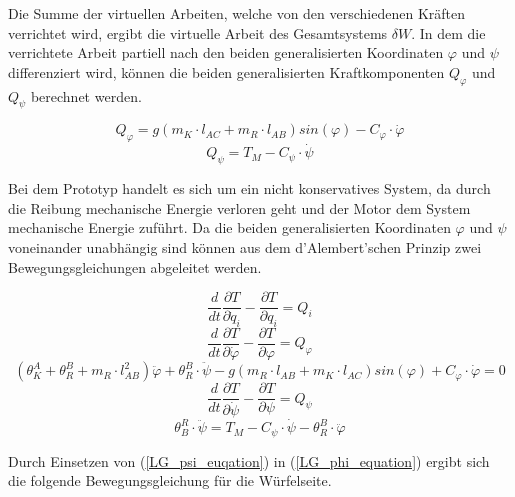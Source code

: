 Die Summe der virtuellen Arbeiten, welche von den verschiedenen Kräften verrichtet wird, ergibt die virtuelle Arbeit des Gesamtsystems $\delta W$. In dem die verrichtete Arbeit partiell nach den beiden generalisierten Koordinaten $\varphi$ und $\psi$ differenziert wird, können die beiden generalisierten Kraftkomponenten $Q_{\varphi}$ und $Q_{\psi}$ berechnet werden.

\begin{equation}
Q_{\varphi} = g(m_K \cdot l_{AC} + m_R \cdot l_{AB})sin(\varphi) - C_{\varphi} \cdot \dot{\varphi}
\end{equation}
\begin{equation}
Q_{\psi} = T_M - C_{\psi} \cdot \dot{\psi}
\end{equation}


Bei dem Prototyp handelt es sich um ein nicht konservatives System, da durch die Reibung mechanische Energie verloren geht und der Motor dem System mechanische Energie zuführt. Da die beiden generalisierten Koordinaten $\varphi$ und $\psi$ voneinander unabhängig sind können aus dem d'Alembert'schen Prinzip zwei Bewegungsgleichungen abgeleitet werden.

\begin{equation}
\frac{d}{dt}\frac{\partial T}{\partial \dot{q}_i}-\frac{\partial T}{\partial q_i} = Q_i
\end{equation}
\begin{equation}
\frac{d}{dt}\frac{\partial T}{\partial \dot{\varphi}}-\frac{\partial T}{\partial \varphi} = Q_{\varphi} 
\end{equation}
\begin{equation}
\label{LG_phi_equation}
({\theta}^A_K + {\theta}^B_R + m_R \cdot l_{AB}^2)\ddot{\varphi} + {\theta}^B_R \cdot \ddot{\psi} - g(m_R \cdot l_{AB} + m_K \cdot l_{AC})sin(\varphi) + C_{\varphi} \cdot \dot{\varphi} = 0
\end{equation}
\begin{equation}
\frac{d}{dt}\frac{\partial T}{\partial \dot{\psi}}-\frac{\partial T}{\partial \psi} = Q_{\psi} 
\end{equation}
\begin{equation}
\label{LG_psi_euqation}
{\theta}^R_B \cdot \ddot{\psi} = T_M - C_{\psi} \cdot \dot{\psi} - {\theta}^B_R \cdot \ddot{\varphi}
\end{equation}

Durch Einsetzen von (\ref{LG_psi_euqation}) in (\ref{LG_phi_equation}) ergibt sich die folgende Bewegungsgleichung für die Würfelseite.

